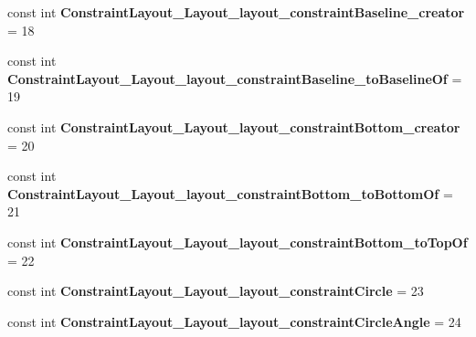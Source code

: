 \begin{DoxyCompactItemize}
\item 
\mbox{\label{classst_delivery_1_1_resource_1_1_styleable_a5e44ce5d192b541f85d38ddd56e944f2}} 
const int {\bfseries Constraint\+Layout\+\_\+\+Layout\+\_\+layout\+\_\+constraint\+Baseline\+\_\+creator} = 18
\item 
\mbox{\label{classst_delivery_1_1_resource_1_1_styleable_ad51dc2e9337d3982cc7966ef92e662a3}} 
const int {\bfseries Constraint\+Layout\+\_\+\+Layout\+\_\+layout\+\_\+constraint\+Baseline\+\_\+to\+Baseline\+Of} = 19
\item 
\mbox{\label{classst_delivery_1_1_resource_1_1_styleable_ae21b27673480a8bcfaed7ee25640b272}} 
const int {\bfseries Constraint\+Layout\+\_\+\+Layout\+\_\+layout\+\_\+constraint\+Bottom\+\_\+creator} = 20
\item 
\mbox{\label{classst_delivery_1_1_resource_1_1_styleable_a346afe5f480c5275ead5f9e381fc6024}} 
const int {\bfseries Constraint\+Layout\+\_\+\+Layout\+\_\+layout\+\_\+constraint\+Bottom\+\_\+to\+Bottom\+Of} = 21
\item 
\mbox{\label{classst_delivery_1_1_resource_1_1_styleable_a6a311fc14f706101b41c21544f75b950}} 
const int {\bfseries Constraint\+Layout\+\_\+\+Layout\+\_\+layout\+\_\+constraint\+Bottom\+\_\+to\+Top\+Of} = 22
\item 
\mbox{\label{classst_delivery_1_1_resource_1_1_styleable_a3f8b90238231993b243778477a1d30d9}} 
const int {\bfseries Constraint\+Layout\+\_\+\+Layout\+\_\+layout\+\_\+constraint\+Circle} = 23
\item 
\mbox{\label{classst_delivery_1_1_resource_1_1_styleable_a0fd2ae5803deea99fe2bfb65c58cd0b2}} 
const int {\bfseries Constraint\+Layout\+\_\+\+Layout\+\_\+layout\+\_\+constraint\+Circle\+Angle} = 24
\item 
\mbox{\label{classst_delivery_1_1_resource_1_1_styleable_a9f57b34b1b2c6b4a893ab5a60fe7e81f}} 

\end{DoxyCompactItemize}
